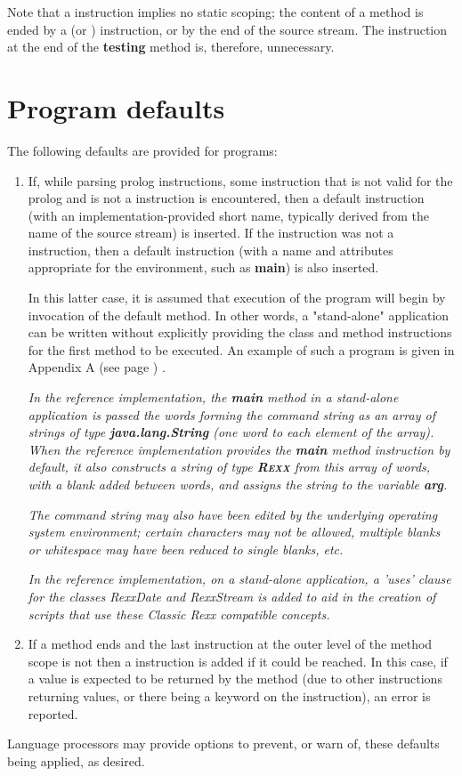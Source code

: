 Note that a  instruction implies no static scoping; the
content of a method is ended by a  (or )
instruction, or by the end of the source stream.
The  instruction at the end of the \textbf{testing}
method is, therefore, unnecessary.
\section{Program defaults}\label{programdefaults}
 
The following defaults are provided for \nr{} programs:
\begin{enumerate}
\item If, while parsing prolog instructions, some instruction that is not
valid for the prolog and is not a  instruction is
encountered, then a default  instruction (with an
implementation-provided short name, typically derived from the name of
the source stream) is inserted.  If the instruction was not a
 instruction, then a default  instruction
(with a name and attributes appropriate for the environment, such
as \textbf{main}) is also inserted.
 
In this latter case, it is assumed that execution of the program will
begin by invocation of the default method.
In other words, a "stand-alone" application can be written without
explicitly providing the class and method instructions for the first
method to be executed.
An example of such a program is given in  Appendix A (see page \pageref{refappa}) .

 
\emph{In the reference implementation, the \textbf{main} method in a
stand-alone application is passed the words forming the command string
as an array of strings of type \textbf{java.lang.String} (one word to
each element of the array).
When the \nr{} reference implementation provides the \textbf{main}
method instruction by default, it also constructs a \nr{} string of
type \textbf{R\textsc{exx}} from this array of words, with a blank added
between words, and assigns the string to the variable
\textbf{arg}.}
 
\emph{The command string may also have been edited by the underlying
operating system environment; certain characters may not be
allowed, multiple blanks or whitespace may have been reduced to
single blanks, etc.
}

\emph{In the reference implementation, on a stand-alone application, a
'uses' clause for the classes RexxDate and RexxStream is added to aid
in the creation of scripts that use these Classic Rexx compatible
concepts.}

\item If a method ends and the last instruction at the outer level of the
method scope is not  then a  instruction
is added if it could be reached.
In this case, if a value is expected to be returned by the method (due
to other  instructions returning values, or there being a
 keyword on the  instruction), an error
is reported.
\end{enumerate}
 
Language processors may provide options to prevent, or warn of, these
defaults being applied, as desired.
